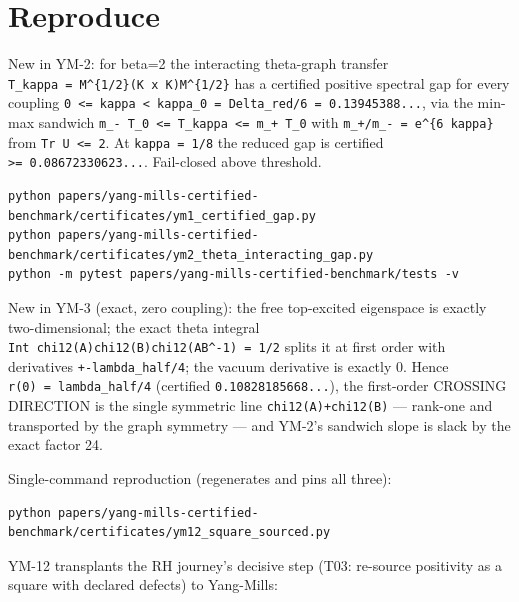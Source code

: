 \hypertarget{reproduce}{%
\section{Reproduce}\label{reproduce}}

New in YM-2: for beta=2 the interacting theta-graph transfer
\texttt{T\_kappa\ =\ M\^{}\{1/2\}(K\ x\ K)M\^{}\{1/2\}} has a certified positive spectral gap for
every coupling \texttt{0\ \textless{}=\ kappa\ \textless{}\ kappa\_0\ =\ Delta\_red/6\ =\ 0.13945388...}, via the
min-max sandwich \texttt{m\_-\ T\_0\ \textless{}=\ T\_kappa\ \textless{}=\ m\_+\ T\_0} with
\texttt{m\_+/m\_-\ =\ e\^{}\{6\ kappa\}} from \texttt{\textbar{}Tr\ U\textbar{}\ \textless{}=\ 2}. At \texttt{kappa\ =\ 1/8} the reduced gap
is certified \texttt{\textgreater{}=\ 0.08672330623...}. Fail-closed above threshold.

\begin{verbatim}
python papers/yang-mills-certified-benchmark/certificates/ym1_certified_gap.py
python papers/yang-mills-certified-benchmark/certificates/ym2_theta_interacting_gap.py
python -m pytest papers/yang-mills-certified-benchmark/tests -v
\end{verbatim}

New in YM-3 (exact, zero coupling): the free top-excited eigenspace is exactly
two-dimensional; the exact theta integral \texttt{Int\ chi12(A)chi12(B)chi12(AB\^{}-1)\ =\ 1/2}
splits it at first order with derivatives \texttt{+-lambda\_half/4}; the vacuum derivative
is exactly 0. Hence \texttt{r\textquotesingle{}(0)\ =\ lambda\_half/4} (certified \texttt{0.10828185668...}), the
first-order CROSSING DIRECTION is the single symmetric line
\texttt{chi12(A)+chi12(B)} --- rank-one and transported by the graph symmetry --- and
YM-2's sandwich slope is slack by the exact factor 24.

Single-command reproduction (regenerates and pins all three):

\begin{verbatim}
python papers/yang-mills-certified-benchmark/certificates/ym12_square_sourced.py
\end{verbatim}

YM-12 transplants the RH journey's decisive step (T03: re-source
positivity as a square with declared defects) to Yang-Mills:

